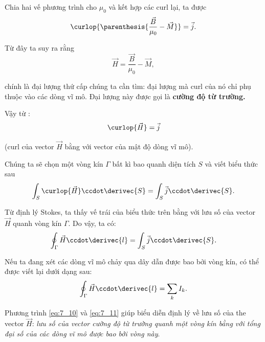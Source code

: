 \noindent
Chia hai vế phương trình cho $\mu_0$ và kết hợp các curl lại, ta được
\begin{equation}\label{eq:7_7}
    \curlop{\parenthesis{\frac{\vec{B}}{\mu_0} - \vec{M}}} = \vec{j}.
\end{equation}

\noindent
Từ đây ta suy ra rằng
\begin{equation}\label{eq:7_8}
    \vec{H} = \frac{\vec{B}}{\mu_0} - \vec{M},
\end{equation}

\noindent
chính là đại lượng thứ cấp chúng ta cần tìm: đại lượng mà curl của nó chỉ phụ thuộc vào các dòng vĩ mô.
Đại lượng này được gọi là \textbf{cường độ từ trường.}

Vậy từ :
\begin{equation}\label{eq:7_9}
    \curlop{\vec{H}} = \vec{j}
\end{equation}

\noindent
(curl của vector $\vec{H}$ bằng với vector của mật độ dòng vĩ mô).

Chúng ta sẽ chọn một vòng kín $\Gamma$ bất kì bao quanh diện tích  $S$ và viết biểu thức sau
\begin{equation*}
    \int_S \curlop{\vec{H}} \ccdot \derivec{S} = \int_S \vec{j} \ccdot \derivec{S}.
\end{equation*}

\noindent
Từ định lý Stokes, ta thấy vế trái của biểu thức trên bằng với lưu số của vector $\vec{H}$ quanh vòng kín $\Gamma$.
Do vậy, ta có:
\begin{equation}\label{eq:7_10}
    \oint_{\Gamma} \vec{H} \ccdot \derivec{l} = \int_S \vec{j} \ccdot \derivec{S}.
\end{equation}

\noindent
Nếu ta đang xét các dòng vĩ mô chảy qua dây dẫn được bao bởi vòng kín,  có thể được viết lại dưới dạng sau:
\begin{equation}\label{eq:7_11}
    \oint_{\Gamma} \vec{H} \ccdot \derivec{l} = \sum_k I_k.
\end{equation}

\noindent
Phương trình \eqref{eq:7_10} và \eqref{eq:7_11} giúp biểu diễn định lý về lưu số của the vector $\vec{H}$: \textit{lưu số của vector cường độ từ trường quanh một vòng kín bằng với tổng đại số của các dòng vĩ mô được bao bởi vòng này}.

